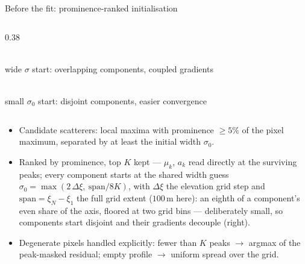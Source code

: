 \begin{frame}{Before the fit: prominence-ranked initialisation}
\begin{columns}[T]
\begin{column}{0.38\textwidth}
      \\[-1pt]
      {\tiny wide $\sigma$ start: overlapping components, coupled gradients}
      \\[7pt]
      \\[-1pt]
      {\tiny small $\sigma_0$ start: disjoint components, easier convergence}
    \end{column}
  \end{columns}
  \vspace{4pt}
  \footnotesize
  \begin{itemize}
    \item Candidate scatterers: local maxima with prominence $\geq 5\%$ of the pixel
          maximum, separated by at least the initial width $\sigma_0$.
    \item Ranked by prominence, top $K$ kept --- $\mu_k$, $a_k$ read directly at the
          surviving peaks; every component starts at the shared width guess
          $\sigma_0 = \max(2\,\Delta\xi,\ \mathrm{span}/8K)$, with $\Delta\xi$ the
          elevation grid step and $\mathrm{span} = \xi_N - \xi_1$ the full grid
          extent ($100$\,m here): an eighth of a component's even share of the
          axis, floored at two grid bins --- deliberately small, so components
          start disjoint and their gradients decouple (right).
    \item Degenerate pixels handled explicitly: fewer than $K$ peaks $\to$ argmax of the
          peak-masked residual; empty profile $\to$ uniform spread over the grid.
  \end{itemize}
\end{frame}

